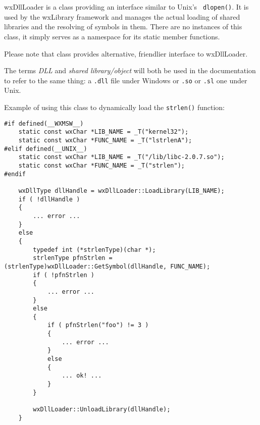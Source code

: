 
\section{}\label{wxdllloader}

wxDllLoader is a class providing an interface similar to Unix's {\tt
dlopen()}. It is used by the wxLibrary framework and manages the actual
loading of shared libraries and the resolving of symbols in them. There are no
instances of this class, it simply serves as a namespace for its static member
functions.

Please note that class  provides 
alternative, friendlier interface to wxDllLoader.

The terms {\it DLL} and {\it shared library/object} will both be used in the
documentation to refer to the same thing: a {\tt .dll} file under Windows or 
{\tt .so} or {\tt .sl} one under Unix.

Example of using this class to dynamically load the {\tt strlen()} function:

\begin{verbatim}
#if defined(__WXMSW__)
    static const wxChar *LIB_NAME = _T("kernel32");
    static const wxChar *FUNC_NAME = _T("lstrlenA");
#elif defined(__UNIX__)
    static const wxChar *LIB_NAME = _T("/lib/libc-2.0.7.so");
    static const wxChar *FUNC_NAME = _T("strlen");
#endif

    wxDllType dllHandle = wxDllLoader::LoadLibrary(LIB_NAME);
    if ( !dllHandle )
    {
        ... error ...
    }
    else
    {
        typedef int (*strlenType)(char *);
        strlenType pfnStrlen = (strlenType)wxDllLoader::GetSymbol(dllHandle, FUNC_NAME);
        if ( !pfnStrlen )
        {
            ... error ...
        }
        else
        {
            if ( pfnStrlen("foo") != 3 )
            {
                ... error ...
            }
            else
            {
                ... ok! ...
            }
        }

        wxDllLoader::UnloadLibrary(dllHandle);
    }
\end{verbatim}

